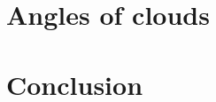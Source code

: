 \documentclass[12pt]{article}
\begin{document}

\newpage
\tableofcontents
\newpage
\pagestyle{plain}

\section{Angles of clouds}

\section{Conclusion}

\newpage
\renewcommand{\emph}{\em}
\printbibliography
\end{document}
